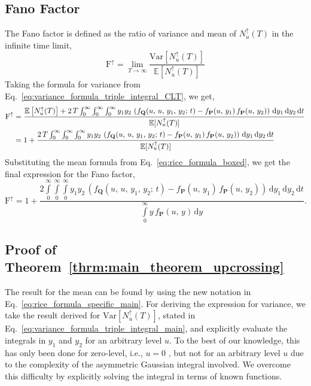 \documentclass[journal]{IEEEtran}
\theoremstyle{plain}
\theoremstyle{definition}
\theoremstyle{remark}
\newcommand{\E}{\mathbb{E}}
\newcommand{\FFup}{\mathrm{F}^\uparrow}
\newcommand{\Nup}{N_u^{\uparrow}(T)}
\newcommand{\dd}{\mathrm{d}}
\newcommand{\Var}{\text{Var}}
\begin{document}
\subsection{Fano Factor}
The Fano factor is defined as the ratio of variance and mean of $\Nup$ in the infinite time limit, 
\begin{equation}
    \FFup = \lim_{T \to \infty}\frac{\Var[\Nup]}{\E[\Nup]}
\end{equation}
Taking the formula for variance from Eq.~\eqref{eq:variance_formula_triple_integral_CLT}, we get,
\begin{equation}
\begin{split}
    \FFup &= \frac{\E\left[\Nup\right] + 2\, T\int_{0}^\infty \int_{0}^\infty \int_{0}^\infty y_1 y_2 \,\left( f_{\mathbf{Q}}(u, \,u, \,y_1, \,y_2; \, t) - f_{\mathbf{P}}(u,\,y_1) \, f_{\mathbf{P}}(u,\,y_2)\right)\, \dd y_1 \, \dd y_2 \, \dd t}{\E[\Nup]} \\
    &= 1 + \frac{2\,T\int_{0}^\infty \int_{0}^\infty \int_{0}^\infty y_1 y_2 \,\left( f_{\mathbf{Q}}(u, \,u, \,y_1, \,y_2; \, t) - f_{\mathbf{P}}(u,\,y_1) \, f_{\mathbf{P}}(u,\,y_2)\right)\, \dd y_1 \, \dd y_2 \, \dd t}{\E[\Nup]}
\end{split}
\raisetag{40pt}
\end{equation}
Substituting the mean formula from Eq.~\eqref{eq:rice_formula_boxed}, we get the final expression for the Fano factor,
\begin{equation}
    \FFup = 1 + \frac{2\int\limits_{0}^\infty \int\limits_{0}^\infty \int\limits_{0}^\infty y_1 y_2 \,\left( f_{\mathbf{Q}}(u, \,u, \,y_1, \,y_2; \, t) - f_{\mathbf{P}}(u,\,y_1) \, f_{\mathbf{P}}(u,\,y_2)\right)\, \dd y_1 \, \dd y_2 \, \dd t}{\int\limits_{0}^\infty y\, f_{\mathbf{P}}(u,\,y) \, \dd y}. \label{eq:fano_factor_upcrossing_1}
\end{equation}



\subsection{Proof of Theorem~\ref{thrm:main_theorem_upcrossing}} \label{section:proof_theorem_upcrossing}
The result for the mean can be found by using the new notation in Eq.~\eqref{eq:rice_formula_specific_main}. For deriving the expression for variance, we take the result derived for $\Var[\Nup]$, stated in Eq.~\eqref{eq:variance_formula_triple_integral_main}, and explicitly evaluate the integrals in $y_1$ and $y_2$ for an arbitrary level $u$. To the best of our knowledge, this has only been done for zero-level, i.e., $u=0$ \cite{steinberg1955short, leadbetter1965variance, pawula1968analysis, lindgren1974spectral, wilson2017periodicity}, but not for an arbitrary level $u$ due to the complexity of
the asymmetric Gaussian integral involved. We overcome this difficulty by explicitly solving the integral in terms
of known functions.
\end{document}
